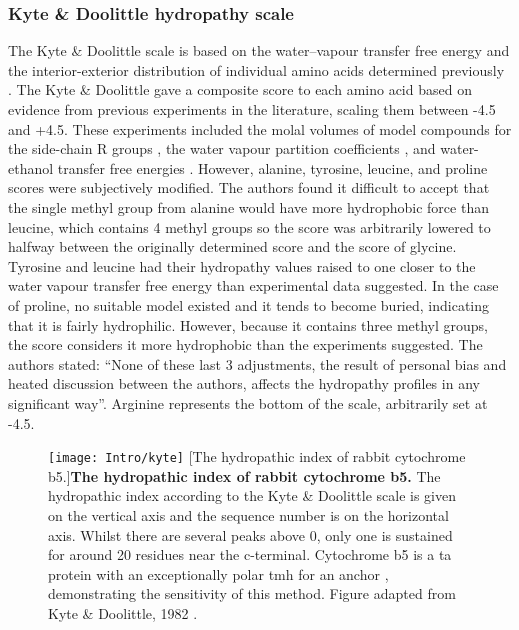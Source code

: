 \subsubsection{Kyte \& Doolittle hydropathy scale}

The Kyte \& Doolittle scale \cite{Kyte1982} is based on the water\---vapour transfer free energy and the interior-exterior distribution of individual amino acids determined previously \cite{Chothia1976}.
The Kyte \& Doolittle gave a composite score to each amino acid based on evidence from previous experiments in the literature, scaling them between -4.5 and +4.5.
These experiments included the molal volumes of model compounds for the side\--chain R groups \cite{Wolfenden1979, Cohn1934, Traube1899}, the water vapour partition coefficients \cite{Hine1975, Wolfenden1979}, and water\--ethanol transfer free energies \cite{Cohn1943, Nozaki1971}.
However, alanine, tyrosine, leucine, and proline scores were subjectively modified.
The authors found it difficult to accept that the single methyl group from alanine would have more hydrophobic force than leucine, which contains 4 methyl groups so the score was arbitrarily lowered to halfway between the originally determined score and the score of glycine.
Tyrosine and leucine had their hydropathy values raised to one closer to the water vapour transfer free energy than experimental data suggested.
In the case of proline, no suitable model existed and it tends to become buried, indicating that it is fairly hydrophilic.
However, because it contains three methyl groups, the score considers it more hydrophobic than the experiments suggested.
The authors stated: ``None of these last 3 adjustments, the result of personal bias and heated discussion between the authors, affects the hydropathy profiles in any significant way''\cite{Kyte1982}.
Arginine represents the bottom of the scale, arbitrarily set at -4.5.

\begin{figure}[ht]
\centering
\texttt{[image: Intro/kyte]}
		[The hydropathic index of rabbit cytochrome b5.]{\textbf{The hydropathic index of rabbit cytochrome b5.}
		The hydropathic index according to the Kyte \& Doolittle scale \cite{Kyte1982} is given on the vertical axis and the sequence number is on the horizontal axis.
		Whilst there are several peaks above 0, only one is sustained for around 20 residues near the c\--terminal.
		Cytochrome b5 is a \gls{ta} protein with an exceptionally polar \gls{tmh} for an anchor \cite{Brambillasca2006}, demonstrating the sensitivity of this method.
		Figure adapted from Kyte \& Doolittle, 1982 \cite{Kyte1982}.
		}
\label{fig:kyte}
\end{figure}

